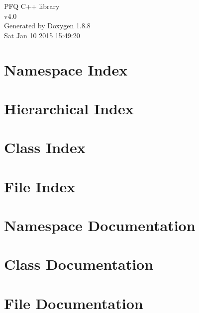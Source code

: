\documentclass[twoside]{book}
\newcommand{\+}{\discretionary{\mbox{\scriptsize$\hookleftarrow$}}{}{}}
\newcommand{\clearemptydoublepage}{%
  \newpage{\pagestyle{empty}\cleardoublepage}%
}
\begin{document}
\hypersetup{pageanchor=false,
             bookmarks=true,
             bookmarksnumbered=true,
             pdfencoding=unicode
            }
\begin{titlepage}
\vspace*{7cm}
\begin{center}%
{\Large P\+F\+Q C++ library \\[1ex]\large v4.\+0 }\\
\vspace*{1cm}
{\large Generated by Doxygen 1.8.8}\\
\vspace*{0.5cm}
{\small Sat Jan 10 2015 15:49:20}\\
\end{center}
\end{titlepage}
\clearemptydoublepage
\tableofcontents
\clearemptydoublepage
{}
\hypersetup{pageanchor=true}

\chapter{Namespace Index}

\chapter{Hierarchical Index}

\chapter{Class Index}

\chapter{File Index}

\chapter{Namespace Documentation}



\chapter{Class Documentation}
















\chapter{File Documentation}





\newpage
{}
{}
\printindex
\end{document}
